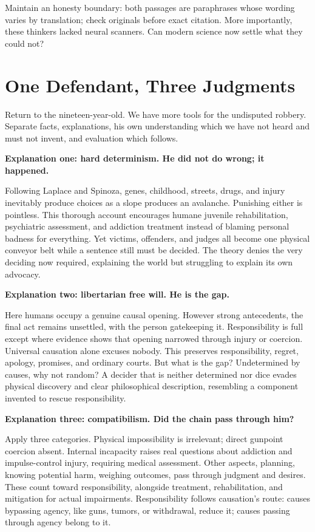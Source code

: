 Maintain an honesty boundary: both passages are paraphrases whose wording varies by translation; check originals before exact citation. More importantly, these thinkers lacked neural scanners. Can modern science now settle what they could not?

\section{One Defendant, Three Judgments}
Return to the nineteen-year-old. We have more tools for the undisputed robbery. Separate facts, explanations, his own understanding which we have not heard and must not invent, and evaluation which follows.

\textbf{Explanation one: hard determinism. He did not do wrong; it happened.}

Following Laplace and Spinoza, genes, childhood, streets, drugs, and injury inevitably produce choices as a slope produces an avalanche. Punishing either is pointless. This thorough account encourages humane juvenile rehabilitation, psychiatric assessment, and addiction treatment instead of blaming personal badness for everything. Yet victims, offenders, and judges all become one physical conveyor belt while a sentence still must be decided. The theory denies the very deciding now required, explaining the world but struggling to explain its own advocacy.

\textbf{Explanation two: libertarian free will. He is the gap.}

Here humans occupy a genuine causal opening. However strong antecedents, the final act remains unsettled, with the person gatekeeping it. Responsibility is full except where evidence shows that opening narrowed through injury or coercion. Universal causation alone excuses nobody. This preserves responsibility, regret, apology, promises, and ordinary courts. But what is the gap? Undetermined by causes, why not random? A decider that is neither determined nor dice evades physical discovery and clear philosophical description, resembling a component invented to rescue responsibility.

\textbf{Explanation three: compatibilism. Did the chain pass through him?}

Apply three categories. Physical impossibility is irrelevant; direct gunpoint coercion absent. Internal incapacity raises real questions about addiction and impulse-control injury, requiring medical assessment. Other aspects, planning, knowing potential harm, weighing outcomes, pass through judgment and desires. These count toward responsibility, alongside treatment, rehabilitation, and mitigation for actual impairments. Responsibility follows causation's route: causes bypassing agency, like guns, tumors, or withdrawal, reduce it; causes passing through agency belong to it.

